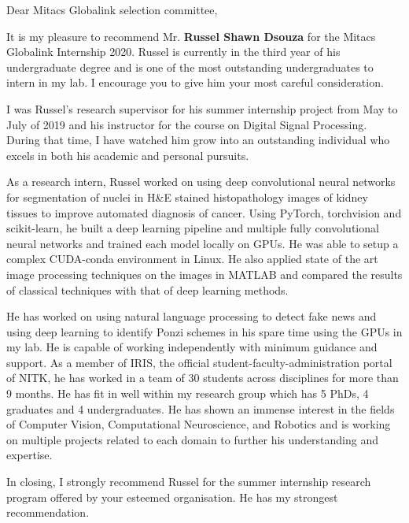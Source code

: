 \documentclass[12pt]{article}
\begin{document}
  \noindent
  Dear Mitacs Globalink selection committee,

  \bigskip
  \noindent
  It is my pleasure to recommend Mr. \textbf{Russel Shawn Dsouza} for the Mitacs Globalink Internship 2020. Russel is currently in the third year of his undergraduate degree and is one of the most outstanding undergraduates to intern in my lab. I encourage you to give him your most careful consideration.

  \medskip
  \noindent
  I was Russel's research supervisor for his summer internship project from May to July of 2019 and his instructor for the course on Digital Signal Processing.
  During that time, I have watched him grow into an outstanding individual who excels in both his academic and personal pursuits.

  \medskip
  \noindent
  As a research intern, Russel worked on using deep convolutional neural networks for segmentation of nuclei in H\&E stained histopathology images of kidney tissues to improve automated diagnosis of cancer.
  Using PyTorch, torchvision and scikit-learn, he built a deep learning pipeline and multiple fully convolutional neural networks and trained each model locally on GPUs. 
  He was able to setup a complex CUDA-conda environment in Linux.
  He also applied state of the art image processing techniques on the images in MATLAB and compared the results of classical techniques with that of deep learning methods.

  \medskip
  \noindent
  He has worked on using natural language processing to detect fake news and using deep learning to identify Ponzi schemes in his spare time using the GPUs in my lab.
  He is capable of working independently with minimum guidance and support. 
  As a member of IRIS, the official student-faculty-administration portal of NITK, he has worked in a team of 30 students across disciplines for more than 9 months.
  He has fit in well within my research group which has 5 PhDs, 4 graduates and 4 undergraduates.
  He has shown an immense interest in the fields of Computer Vision, Computational Neuroscience, and Robotics and is working on multiple projects related to each domain to further his understanding and expertise.

  \medskip
  \noindent
  In closing, I strongly recommend Russel for the summer internship research program offered by your esteemed organisation. He has my strongest recommendation.
\end{document}
